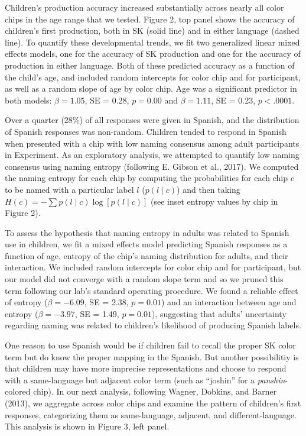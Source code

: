 \documentclass[,man,floatsintext]{apa6}
\theoremstyle{definition}
\theoremstyle{definition}
\theoremstyle{definition}
\theoremstyle{remark}
\begin{document}
Children's production accuracy increased substantially across nearly all
color chips in the age range that we tested. Figure 2, top panel shows
the accuracy of children's first production, both in SK (solid line) and
in either language (dashed line). To quantify these developmental
trends, we fit two generalized linear mixed effects models, one for the
accuracy of SK production and one for the accuracy of production in
either language. Both of these predicted accuracy as a function of the
child's age, and included random intercepts for color chip and for
participant, as well as a random slope of age by color chip. Age was a
significant predictor in both models: \(\beta = 1.05\), SE = 0.28,
\(p = 0.00\) and \(\beta = 1.11\), SE = 0.23, \(p < .0001\).

Over a quarter (28\%) of all responses were given in Spanish, and the
distribution of Spanish responses was non-random. Children tended to
respond in Spanish when presented with a chip with low naming consensus
among adult participants in Experiment. As an exploratory analysis, we
attempted to quantify low naming consensus using naming entropy
(following E. Gibson et al., 2017). We computed the naming entropy for
each chip by computing the probabilities for each chip \(c\) to be named
with a particular label \(l\) (\(p(l \mid c)\)) and then taking
\(H(c) = - \sum{p(l\mid c) \log[p(l \mid c)]}\) (see inset entropy
values by chip in Figure 2).

To assess the hypothesis that naming entropy in adults was related to
Spanish use in children, we fit a mixed effects model predicting Spanish
responses as a function of age, entropy of the chip's naming
distribution for adults, and their interaction. We included random
intercepts for color chip and for participant, but our model did not
converge with a random slope term and so we pruned this term following
our lab's standard operating procedure. We found a reliable effect of
entropy (\(\beta = -6.09\), SE = 2.38, \(p = 0.01\)) and an interaction
between age and entropy (\(\beta = -3.97\), SE = 1.49, \(p = 0.01\)),
suggesting that adults' uncertainty regarding naming was related to
children's likelihood of producing Spanish labels.

One reason to use Spanish would be if children fail to recall the proper
SK color term but do know the proper mapping in the Spanish. But another
possibilitiy is that children may have more imprecise representations
and choose to respond with a same-language but adjacent color term (such
as \enquote{joshin} for a \emph{panshin}-colored chip). In our next
analysis, following Wagner, Dobkins, and Barner (2013), we aggregate
across color chips and examine the pattern of children's first
responses, categorizing them as same-language, adjacent, and
different-language. This analysis is shown in Figure 3, left panel.
\end{document}
